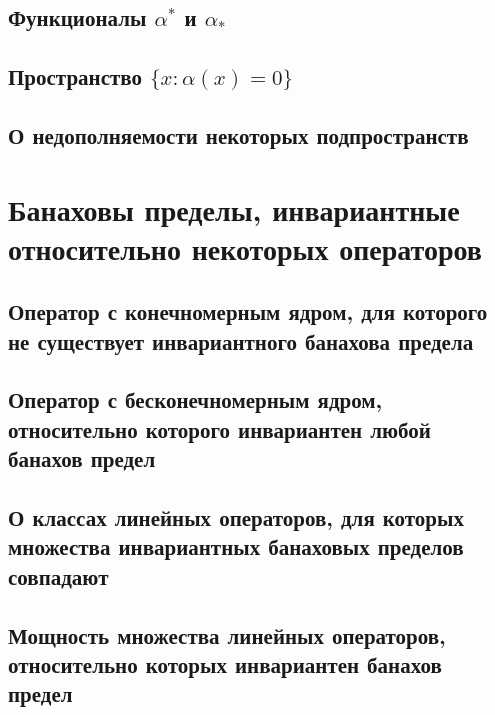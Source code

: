 \documentclass[12pt,a4paper,openbib]{report}
\theoremstyle{definition}
\begin{document}
	\section{Функционалы $\alpha^*$ и $\alpha_*$}
	

	\section{Пространство $\{x: \alpha(x) = 0\}$}
	

	\section{О недополняемости некоторых подпространств}
	

\chapter{Банаховы пределы, инвариантные относительно некоторых операторов}

	

	\section{Оператор с конечномерным ядром, для которого не существует инвариантного банахова предела}
	

	\section{Оператор с бесконечномерным ядром, относительно которого инвариантен любой банахов предел}
	

	\section{О классах линейных операторов, для которых множества инвариантных банаховых пределов совпадают}
	

	\section{Мощность множества линейных операторов, относительно которых инвариантен банахов предел}
	
\end{document}
